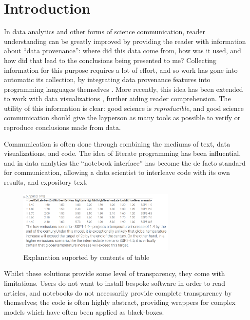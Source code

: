 \section{Introduction}

In data analytics and other forms of science communication, reader understanding can be greatly improved by
providing the reader with information about ``data provenance'': where did this data come from, how was it
used, and how did that lead to the conclusions being presented to me? Collecting information for this purpose
requires a lot of effort, and so work has gone into automatic its collection, by integrating data provenance
features into programming languages themselves \cite{fehrenbach16}. More recently, this idea has been extended
to work with data visualizations \cite{perera22}, further aiding reader comprehension. The utility of this
information is clear: good science  is \emph{reproducible}, and good science communication should give the
layperson as many tools as possible to verify or reproduce conclusions made from data.

Communication is often done through combining the mediums of text, data visualizations, and code. The idea of
literate programming \cite{knuth84} has been influential, and in data analytics the ``notebook interface''
\cite{kluyver16} has become the de facto standard for communication, allowing a data scientist to interleave
code with its own results, and expository text.

\begin{figure}[h]
   \includegraphics[width=0.7\textwidth]{fig/ipcc-table-explanation.png}
   \caption{Explanation suported by contents of table}
   \label{fig:table-explanation}
\end{figure}

Whilst these solutions provide some level of transparency, they come with limitations. Users do not want to
install bespoke software in order to read articles, and notebooks do not necessarily provide complete
transparency by themselves; the code is often highly abstract, providing wrappers
for complex models which have often been applied as black-boxes.

